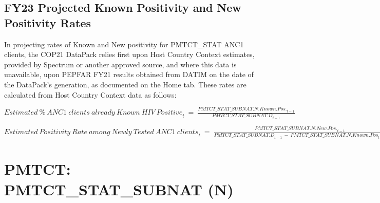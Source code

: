 \documentclass[
  openany]{book}
\begin{document}
\hypertarget{fy23-projected-known-positivity-and-new-positivity-rates}{%
\subsection{FY23 Projected Known Positivity and New Positivity Rates}\label{fy23-projected-known-positivity-and-new-positivity-rates}}

In projecting rates of Known and New positivity for PMTCT\_STAT ANC1
clients, the COP21 DataPack relies first upon Host Country Context
estimates, provided by Spectrum or another approved source, and where
this data is unavailable, upon PEPFAR FY21 results obtained from DATIM
on the date of the DataPack's generation, as documented on the Home tab.
These rates are calculated from Host Country Context data as follows:

\begin{center} ${Estimated\ \%\ ANC1\ clients\ already\ Known\ HIV\ Positive}_{t}\  = \ \frac{{PMTCT\_ STAT\_ SUBNAT.N.Known.Pos.}_{t - 1}}{{PMTCT\_ STAT\_ SUBNAT.D}_{t - 1}}$ \end{center}

\begin{center} ${Estimated\ Positivity\ Rate\ among\ Newly\ Tested\ ANC1\ clients}_{t}\  = \ \frac{{PMTCT\_ STAT\_ SUBNAT.N.New.Pos.}_{t - 1}}{{PMTCT\_ STAT\_ SUBNAT.D}_{t - 1}\  - \ {PMTCT\_ STAT\_ SUBNAT.N.Known.Pos}_{t - 1}}$ \end{center}

\hypertarget{pmtct-pmtct_stat_subnat-n}{%
\section{PMTCT: PMTCT\_STAT\_SUBNAT (N)}\label{pmtct-pmtct_stat_subnat-n}}
\end{document}

